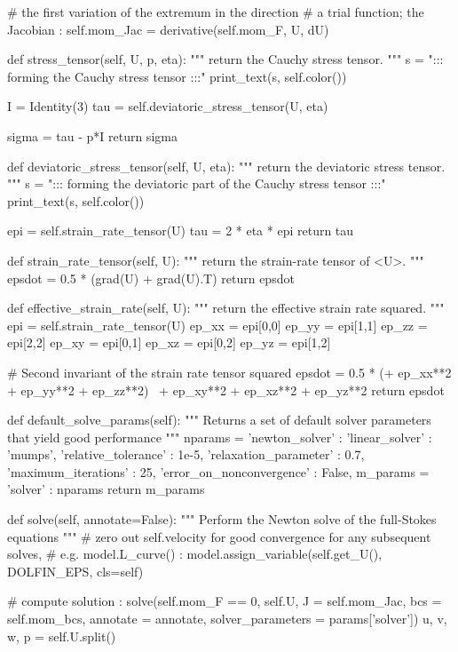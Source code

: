 \begin{python}[label=cslvr_full_stokes, caption={\CSLVR source code contained in the \texttt{MomentumDukowiczStokes} class.}]
# the first variation of the extremum in the direction 
# a trial function; the Jacobian :
self.mom_Jac = derivative(self.mom_F, U, dU)

def stress_tensor(self, U, p, eta):
  """
  return the Cauchy stress tensor.
  """
  s   = "::: forming the Cauchy stress tensor :::"
  print_text(s, self.color())

  I     = Identity(3)
  tau   = self.deviatoric_stress_tensor(U, eta)

  sigma = tau - p*I
  return sigma

def deviatoric_stress_tensor(self, U, eta):
  """
  return the deviatoric stress tensor.
  """
  s   = "::: forming the deviatoric part of the Cauchy stress tensor :::"
  print_text(s, self.color())

  epi = self.strain_rate_tensor(U)
  tau = 2 * eta * epi
  return tau

def strain_rate_tensor(self, U):
  """
  return the strain-rate tensor of <U>.
  """
  epsdot = 0.5 * (grad(U) + grad(U).T)
  return epsdot

def effective_strain_rate(self, U):
  """
  return the effective strain rate squared.
  """
  epi    = self.strain_rate_tensor(U)
  ep_xx  = epi[0,0]
  ep_yy  = epi[1,1]
  ep_zz  = epi[2,2]
  ep_xy  = epi[0,1]
  ep_xz  = epi[0,2]
  ep_yz  = epi[1,2]
  
  # Second invariant of the strain rate tensor squared
  epsdot = 0.5 * (+ ep_xx**2 + ep_yy**2 + ep_zz**2) \
                  + ep_xy**2 + ep_xz**2 + ep_yz**2
  return epsdot

def default_solve_params(self):
  """ 
  Returns a set of default solver parameters that yield good performance
  """
  nparams = {'newton_solver' :
            {
              'linear_solver'            : 'mumps',
              'relative_tolerance'       : 1e-5,
              'relaxation_parameter'     : 0.7,
              'maximum_iterations'       : 25,
              'error_on_nonconvergence'  : False,
            }}
  m_params  = {'solver'      : nparams}
  return m_params

def solve(self, annotate=False):
  """ 
  Perform the Newton solve of the full-Stokes equations 
  """
  # zero out self.velocity for good convergence for any subsequent solves,
  # e.g. model.L_curve() :
  model.assign_variable(self.get_U(), DOLFIN_EPS, cls=self)
  
  # compute solution :
  solve(self.mom_F == 0, self.U, J = self.mom_Jac, bcs = self.mom_bcs,
        annotate = annotate, solver_parameters = params['solver'])
  u, v, w, p = self.U.split()
  
\end{python}




